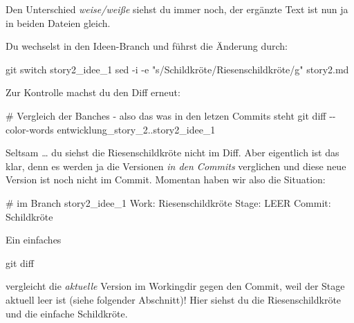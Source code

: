 \documentclass[
  letterpaper,
  DIV=11]{scrreprt}
\newenvironment{Shaded}{\begin{snugshade}}{\end{snugshade}}
\newcommand{\AttributeTok}[1]{\textcolor[rgb]{0.40,0.45,0.13}{#1}}
\newcommand{\CommentTok}[1]{\textcolor[rgb]{0.37,0.37,0.37}{#1}}
\newcommand{\ExtensionTok}[1]{\textcolor[rgb]{0.00,0.23,0.31}{#1}}
\newcommand{\FunctionTok}[1]{\textcolor[rgb]{0.28,0.35,0.67}{#1}}
\newcommand{\NormalTok}[1]{\textcolor[rgb]{0.00,0.23,0.31}{#1}}
\newcommand{\StringTok}[1]{\textcolor[rgb]{0.13,0.47,0.30}{#1}}
\begin{document}
Den Unterschied \emph{weise/weiße} siehst du immer noch, der ergänzte
Text ist nun ja in beiden Dateien gleich.

Du wechselst in den Ideen-Branch und führst die Änderung durch:

\begin{Shaded}
\begin{Highlighting}[]
\FunctionTok{git}\NormalTok{ switch story2\_idee\_1 }
\FunctionTok{sed} \AttributeTok{{-}i} \AttributeTok{{-}e} \StringTok{"s/Schildkröte/Riesenschildkröte/g"}\NormalTok{ story2.md}
\end{Highlighting}
\end{Shaded}

Zur Kontrolle machst du den Diff erneut:

\begin{Shaded}
\begin{Highlighting}[]
\CommentTok{\# Vergleich der Banches {-} also das was in den letzen Commits steht}
\FunctionTok{git}\NormalTok{ diff }\AttributeTok{{-}{-}color{-}words}\NormalTok{ entwicklung\_story\_2..story2\_idee\_1}
\end{Highlighting}
\end{Shaded}

Seltsam \ldots{} du siehst die Riesenschildkröte nicht im Diff. Aber
eigentlich ist das klar, denn es werden ja die Versionen \emph{in den
Commits} verglichen und diese neue Version ist noch nicht im Commit.
Momentan haben wir also die Situation:

\begin{Shaded}
\begin{Highlighting}[]
\CommentTok{\# im Branch story2\_idee\_1}
\ExtensionTok{Work:}\NormalTok{   Riesenschildkröte}
\ExtensionTok{Stage:}\NormalTok{  LEER}
\ExtensionTok{Commit:}\NormalTok{ Schildkröte}
\end{Highlighting}
\end{Shaded}

Ein einfaches

\begin{Shaded}
\begin{Highlighting}[]
\FunctionTok{git}\NormalTok{ diff }
\end{Highlighting}
\end{Shaded}

vergleicht die \emph{aktuelle} Version im Workingdir gegen den Commit,
weil der Stage aktuell leer ist (siehe folgender Abschnitt)! Hier siehst
du die Riesenschildkröte und die einfache Schildkröte.
\end{document}
